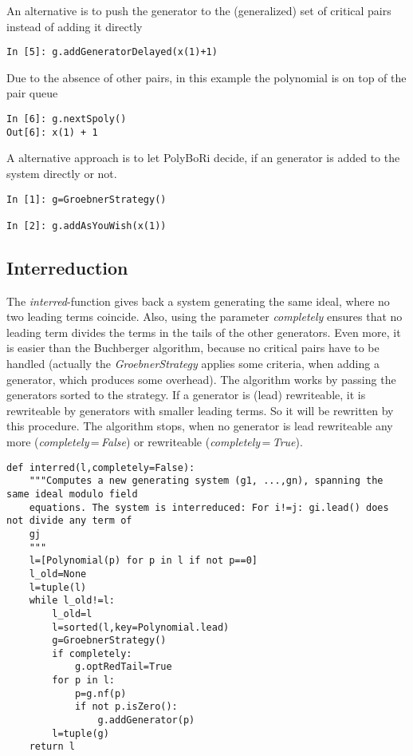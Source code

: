 \documentclass[]{article}
\newcommand{\functionname}[1]{\textit{#1}\xspace}
\newcounter{thm}
\begin{document}
An alternative is to push the generator to the (generalized) set of critical pairs instead of adding it directly
\begin{verbatim}
In [5]: g.addGeneratorDelayed(x(1)+1)
\end{verbatim}
Due to the absence of other pairs, in this example the polynomial is on top of the pair queue
\begin{verbatim}
In [6]: g.nextSpoly()
Out[6]: x(1) + 1
\end{verbatim}

A alternative approach is to let PolyBoRi decide, if an generator is added to the system directly or not.
\begin{verbatim}
In [1]: g=GroebnerStrategy()

In [2]: g.addAsYouWish(x(1))
\end{verbatim}

\subsection{Interreduction}
The \functionname{interred}-function gives back a system generating the same ideal, where no two leading terms coincide.
Also, using the parameter \functionname{completely} ensures that no leading term divides the terms in the tails of the other generators.
Even more, it is easier than the Buchberger algorithm, because no critical pairs have to be handled (actually the \functionname{GroebnerStrategy} applies some criteria, when adding a generator, which produces some overhead).
The algorithm works by passing the generators sorted to the strategy. If a generator is (lead) rewriteable, it is rewriteable by generators with smaller leading terms.
So it will be rewritten by this procedure.
The algorithm stops, when no generator is lead rewriteable any more (\functionname{completely}\,=\,\functionname{False}) or rewriteable (\functionname{completely}\,=\,\functionname{True}).
\begin{verbatim}
def interred(l,completely=False):
    """Computes a new generating system (g1, ...,gn), spanning the same ideal modulo field
    equations. The system is interreduced: For i!=j: gi.lead() does not divide any term of
    gj
    """
    l=[Polynomial(p) for p in l if not p==0]
    l_old=None
    l=tuple(l)
    while l_old!=l:
        l_old=l
        l=sorted(l,key=Polynomial.lead)
        g=GroebnerStrategy()
        if completely:
            g.optRedTail=True
        for p in l:
            p=g.nf(p)
            if not p.isZero():
                g.addGenerator(p)
        l=tuple(g)
    return l
\end{verbatim}
\end{document}
